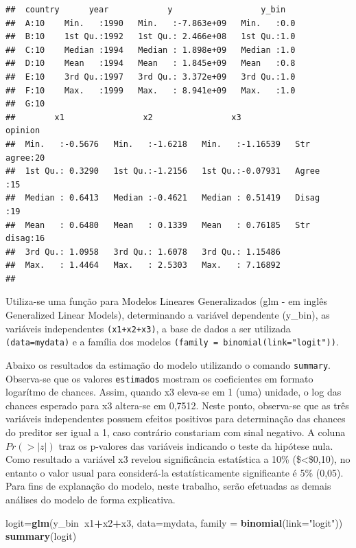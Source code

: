 \documentclass[12pt,brazil,]{book}
\newenvironment{Shaded}{\begin{snugshade}}{\end{snugshade}}
\newcommand{\DataTypeTok}[1]{\textcolor[rgb]{0.13,0.29,0.53}{#1}}
\newcommand{\KeywordTok}[1]{\textcolor[rgb]{0.13,0.29,0.53}{\textbf{#1}}}
\newcommand{\NormalTok}[1]{#1}
\newcommand{\OperatorTok}[1]{\textcolor[rgb]{0.81,0.36,0.00}{\textbf{#1}}}
\newcommand{\StringTok}[1]{\textcolor[rgb]{0.31,0.60,0.02}{#1}}
\begin{document}
\begin{verbatim}
##  country      year            y                  y_bin    
##  A:10    Min.   :1990   Min.   :-7.863e+09   Min.   :0.0  
##  B:10    1st Qu.:1992   1st Qu.: 2.466e+08   1st Qu.:1.0  
##  C:10    Median :1994   Median : 1.898e+09   Median :1.0  
##  D:10    Mean   :1994   Mean   : 1.845e+09   Mean   :0.8  
##  E:10    3rd Qu.:1997   3rd Qu.: 3.372e+09   3rd Qu.:1.0  
##  F:10    Max.   :1999   Max.   : 8.941e+09   Max.   :1.0  
##  G:10                                                     
##        x1                x2                x3                opinion  
##  Min.   :-0.5676   Min.   :-1.6218   Min.   :-1.16539   Str agree:20  
##  1st Qu.: 0.3290   1st Qu.:-1.2156   1st Qu.:-0.07931   Agree    :15  
##  Median : 0.6413   Median :-0.4621   Median : 0.51419   Disag    :19  
##  Mean   : 0.6480   Mean   : 0.1339   Mean   : 0.76185   Str disag:16  
##  3rd Qu.: 1.0958   3rd Qu.: 1.6078   3rd Qu.: 1.15486                 
##  Max.   : 1.4464   Max.   : 2.5303   Max.   : 7.16892                 
## 
\end{verbatim}

Utiliza-se uma função para Modelos Lineares Generalizados (glm - em
inglês Generalized Linear Models), determinando a variável dependente
(y\_bin), as variáveis independentes \texttt{(x1+x2+x3)}, a base de
dados a ser utilizada \texttt{(data=mydata)} e a família dos modelos
\texttt{(family\ =\ binomial(link="logit"))}.

Abaixo os resultados da estimação do modelo utilizando o comando
\texttt{summary}. Observa-se que os valores \texttt{estimados} mostram
os coeficientes em formato logarítmo de chances. Assim, quando x3
eleva-se em 1 (uma) unidade, o log das chances esperado para x3
altera-se em 0,7512. Neste ponto, observa-se que as três variáveis
independentes possuem efeitos positivos para determinação das chances do
preditor ser igual a 1, caso contrário constariam com sinal negativo. A
coluna \(Pr(>|z|)\) traz os p-valores das variáveis indicando o teste da
hipótese nula. Como resultado a variável x3 revelou significância
estatística a 10\% (\$\textless{}\$0,10), no entanto o valor usual para
considerá-la estatísticamente significante é 5\% (0,05). Para fins de
explanação do modelo, neste trabalho, serão efetuadas as demais análises
do modelo de forma explicativa.

\begin{Shaded}
\begin{Highlighting}[]
\NormalTok{logit=}\KeywordTok{glm}\NormalTok{(y_bin}\OperatorTok{~}\NormalTok{x1}\OperatorTok{+}\NormalTok{x2}\OperatorTok{+}\NormalTok{x3, }\DataTypeTok{data=}\NormalTok{mydata, }\DataTypeTok{family =} \KeywordTok{binomial}\NormalTok{(}\DataTypeTok{link=}\StringTok{"logit"}\NormalTok{))}
\KeywordTok{summary}\NormalTok{(logit)}
\end{Highlighting}
\end{Shaded}
\end{document}
